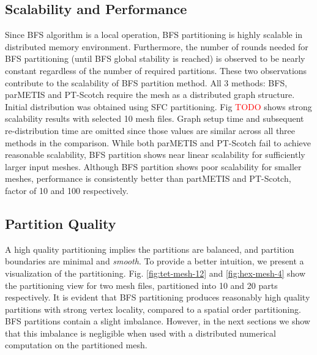 \documentclass[conference]{IEEEtran}
\begin{document}
\subsection{Scalability and Performance}
Since BFS algorithm is a local operation, BFS partitioning is highly scalable in distributed memory environment. Furthermore, the number of rounds needed for BFS partitioning (until BFS global stability is reached) is observed to be nearly constant regardless of the number of required partitions. These two observations contribute to the scalability of BFS partition method. All 3 methods: BFS, parMETIS and PT-Scotch require the mesh as a distributed graph structure. Initial distribution was obtained using SFC partitioning. Fig \textcolor{red}{TODO} shows strong scalability results with selected 10 mesh files. Graph setup time and subsequent re-distribution time are omitted since those values are similar across all three methods in the comparison. While both parMETIS and PT-Scotch fail to achieve reasonable scalability, BFS partition shows near linear scalability for sufficiently larger input meshes. Although BFS partition shows poor scalability for smaller meshes, performance is consistently better than partMETIS and PT-Scotch, factor of 10 and 100 respectively.


\subsection{Partition Quality}



A high quality partitioning implies the partitions are balanced, and partition boundaries are minimal and \emph{smooth}. To provide a better intuition, we present a visualization of the partitioning. Fig. \ref{fig:tet-mesh-12} and \ref{fig:hex-mesh-4} show the partitioning view for two mesh files, partitioned into 10 and 20 parts respectively. It is evident that BFS partitioning produces reasonably high quality partitions with strong vertex locality, compared to a spatial order partitioning. BFS partitions contain a slight imbalance. However, in the next sections we show that this imbalance is negligible when used with a distributed numerical computation on the partitioned mesh.
\end{document}
